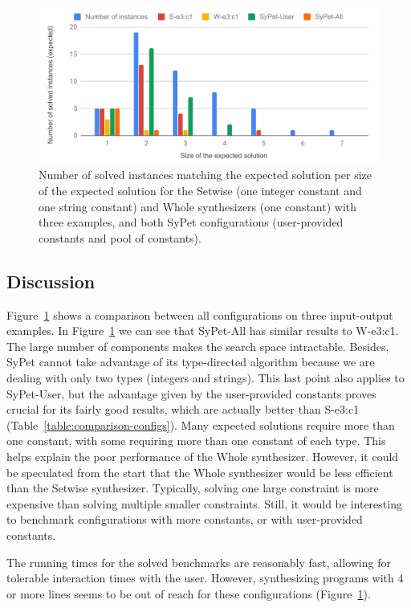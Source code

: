 \begin{figure}
  \centering
  \includegraphics[scale=0.7]{assets/comparison-expected-sypet-small.pdf}
  \caption{Number of solved instances matching the expected solution per size of
    the expected solution for the Setwise (one integer constant and one string
    constant) and Whole synthesizers (one constant) with three examples, and
    both SyPet configurations (user-provided constants and pool of constants).}
  \label{fig:comparison-expected-sypet}
\end{figure}

\subsection{Discussion}
\label{sec:discussion}

Figure~\ref{fig:comparison-expected-sypet} shows a comparison between all
configurations on three input-output examples.
In Figure~\ref{fig:comparison-expected-sypet} we can see that SyPet-All has
similar results to W-e3:c1.
The large number of components makes the search space intractable.
Besides, SyPet cannot take advantage of its type-directed algorithm because
we are dealing with only two types (integers and strings).
This last point also applies to SyPet-User, but the advantage given by the
user-provided constants proves crucial for its fairly good results, which are
actually better than S-e3:c1 (Table~\ref{table:comparison-configs}).
Many expected solutions require more than one constant, with some requiring more
than one constant of each type.
This helps explain the poor performance of the Whole synthesizer.
However, it could be speculated from the start that the Whole synthesizer would
be less efficient than the Setwise synthesizer.
Typically, solving one large constraint is more expensive than solving multiple
smaller constraints.
Still, it would be interesting to benchmark configurations with more
constants, or with user-provided constants.

The running times for the solved benchmarks are reasonably fast, allowing for
tolerable interaction times with the user.
However, synthesizing programs with 4 or more lines seems to be out of reach for
these configurations (Figure~\ref{fig:comparison-expected-sypet}).
